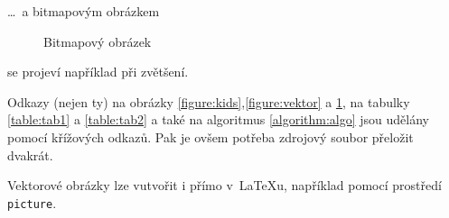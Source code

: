 \documentclass[a4paper, 11pt]{article}
\begin{document}
\bigskip
\noindent \dots\ a bitmapovým obrázkem

\begin{figure}[h]

\centering
{
\caption{\label{figure:bitmap}Bitmapový obrázek}
}
\end{figure}
\bigskip
\noindent se projeví například při zvětšení.

Odkazy (nejen ty) na obrázky \ref{figure:kids},\ref{figure:vektor} a \ref{figure:bitmap}, na tabulky \ref{table:tab1} a \ref{table:tab2} a také na algoritmus \ref{algorithm:algo} jsou udělány pomocí křížových odkazů. Pak je ovšem potřeba zdrojový soubor přeložit dvakrát.

Vektorové obrázky lze vutvořit i přímo v~\LaTeX u, například pomocí prostředí \texttt{picture}.
\end{document}
